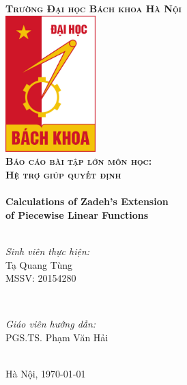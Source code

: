 \documentclass[../report.tex]{subfiles}
\begin{document}
\begin{titlepage}

\center
 
\textsc{\Huge\bfseries Trường Đại học Bách khoa Hà Nội}\\[1cm] %
\includegraphics[width=3.5cm]{figures/hust.jpg}\\[1cm] %
 
\textsc{\LARGE\bfseries Báo cáo bài tập lớn môn học:} \\[0.2cm]
\textsc{\huge\bfseries Hệ trợ giúp quyết định}\\[1cm] %

\HRule \\[0.4cm]
{\Huge\bfseries Calculations of Zadeh's Extension\\[8mm]of Piecewise Linear Functions}\\[0.3cm] %
\HRule \\[1.5cm]

\begin{minipage}{0.4\textwidth}
\begin{flushleft} \large
\emph{Sinh viên thực hiện:}\\
Tạ Quang Tùng \\ 
MSSV: 20154280
\end{flushleft}
\end{minipage}
~
\begin{minipage}{0.4\textwidth}
\begin{flushright} \large
\emph{Giáo viên hướng dẫn:} \\
PGS.TS. Phạm Văn Hải
\end{flushright}
\end{minipage}\\[4cm]

{\large Hà Nội, \today}\\[1cm] %

\vfill %

\end{titlepage}
\end{document}
